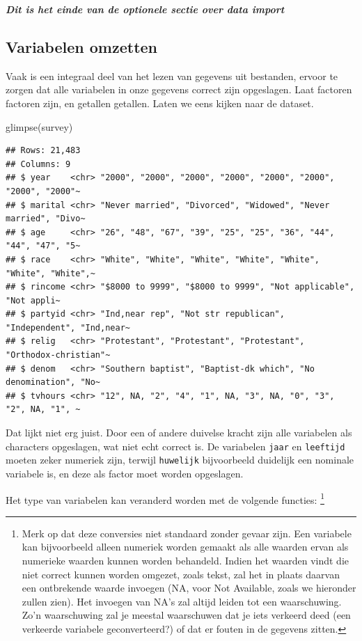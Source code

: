 \documentclass[]{tufte-book}
\newenvironment{Shaded}{}{}
\newcommand{\FunctionTok}[1]{\textcolor[rgb]{0.02,0.16,0.49}{#1}}
\newcommand{\NormalTok}[1]{#1}
\begin{document}
\emph{\textbf{Dit is het einde van de optionele sectie over data import}}

\hypertarget{variabelen-omzetten}{%
\subsection{Variabelen omzetten}\label{variabelen-omzetten}}

Vaak is een integraal deel van het lezen van gegevens uit bestanden, ervoor te zorgen dat alle variabelen in onze gegevens correct zijn opgeslagen. Laat factoren factoren zijn, en getallen getallen. Laten we eens kijken naar de dataset.

\begin{Shaded}
\begin{Highlighting}[]
\FunctionTok{glimpse}\NormalTok{(survey)}
\end{Highlighting}
\end{Shaded}

\begin{verbatim}
## Rows: 21,483
## Columns: 9
## $ year    <chr> "2000", "2000", "2000", "2000", "2000", "2000", "2000", "2000"~
## $ marital <chr> "Never married", "Divorced", "Widowed", "Never married", "Divo~
## $ age     <chr> "26", "48", "67", "39", "25", "25", "36", "44", "44", "47", "5~
## $ race    <chr> "White", "White", "White", "White", "White", "White", "White",~
## $ rincome <chr> "$8000 to 9999", "$8000 to 9999", "Not applicable", "Not appli~
## $ partyid <chr> "Ind,near rep", "Not str republican", "Independent", "Ind,near~
## $ relig   <chr> "Protestant", "Protestant", "Protestant", "Orthodox-christian"~
## $ denom   <chr> "Southern baptist", "Baptist-dk which", "No denomination", "No~
## $ tvhours <chr> "12", NA, "2", "4", "1", NA, "3", NA, "0", "3", "2", NA, "1", ~
\end{verbatim}

Dat lijkt niet erg juist. Door een of andere duivelse kracht zijn alle variabelen als characters opgeslagen, wat niet echt correct is. De variabelen \texttt{jaar} en \texttt{leeftijd} moeten zeker numeriek zijn, terwijl \texttt{huwelijk} bijvoorbeeld duidelijk een nominale variabele is, en deze als factor moet worden opgeslagen.

Het type van variabelen kan veranderd worden met de volgende functies: \footnote{Merk op dat deze conversies niet standaard zonder gevaar zijn. Een variabele kan bijvoorbeeld alleen numeriek worden gemaakt als alle waarden ervan als numerieke waarden kunnen worden behandeld. Indien het waarden vindt die niet correct kunnen worden omgezet, zoals tekst, zal het in plaats daarvan een ontbrekende waarde invoegen (NA, voor Not Available, zoals we hieronder zullen zien). Het invoegen van NA's zal altijd leiden tot een waarschuwing. Zo'n waarschuwing zal je meestal waarschuwen dat je iets verkeerd deed (een verkeerde variabele geconverteerd?) of dat er fouten in de gegevens zitten.}
\end{document}
